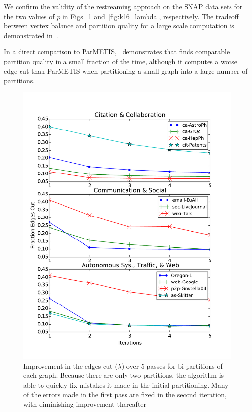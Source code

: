We confirm the validity of the restreaming approach on the SNAP data sets for the two values of $p$ in Figs.~\ref{fig:k2_lambda} and~\ref{fig:k16_lambda}, respectively. The tradeoff between vertex balance and partition quality for a large scale \ourmethod computation is demonstrated in~.

In a direct comparison to ParMETIS,~ demonstrates that \ourmethod finds comparable partition quality in a small fraction of the time, although it computes a worse edge-cut than ParMETIS when partitioning a small graph into a large number of partitions. 

\begin{figure}[t!]
\centering
\includegraphics[width=0.9\columnwidth] {figures/real_k2_lambda.pdf}
\caption[Caption for]{Improvement in the edges cut ($\lambda$) over 5 passes for bi-partitions of each graph. Because there are only two partitions, the algorithm is able to quickly fix mistakes it made in the initial partitioning. Many of the errors made in the first pass are fixed in the second iteration, with diminishing improvement thereafter.}
\label{fig:k2_lambda}
\end{figure}


